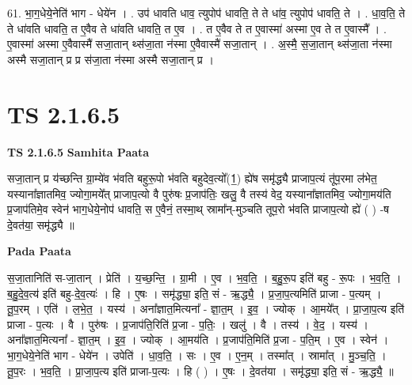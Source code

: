 \documentclass[17pt]{extarticle}
\begin{document}
61. भा॒ग॒धेये॒नेति॑ भाग - धेये॑न । . उप॑ धावति धाव॒ त्युपोप॑ धावति॒ ते ते धा॑व॒ त्युपोप॑ धावति॒ ते । . धा॒व॒ति॒ ते ते धा॑वति धावति॒ त ए॒वैव ते धा॑वति धावति॒ त ए॒व । . त ए॒वैव ते त ए॒वास्मा॑ अस्मा ए॒व ते त ए॒वास्मै᳚ । . ए॒वास्मा॑ अस्मा ए॒वैवास्मै॑ सजा॒तान् थ्स॑जा॒ता न॑स्मा ए॒वैवास्मै॑ सजा॒तान् । . अ॒स्मै॒ स॒जा॒तान् थ्स॑जा॒ता न॑स्मा अस्मै सजा॒तान् प्र प्र स॑जा॒ता न॑स्मा अस्मै सजा॒तान् प्र । \newline
\pagebreak
{}
\section*{ TS 2.1.6.5 }

\textbf{TS 2.1.6.5 } \newline
\textbf{Samhita Paata} \newline

सजा॒तान् प्र य॑च्छन्ति ग्रा॒म्ये॑व भ॑वति बहुरू॒पो भ॑वति बहुदेव॒त्यो᳚(1॒) ह्ये॑ष समृ॑द्ध्यै प्राजाप॒त्यं तू॑प॒रमा ल॑भेत॒ यस्याना᳚ज्ञातमिव॒ ज्योगा॒मये᳚त् प्राजाप॒त्यो वै पुरु॑षः प्र॒जाप॑तिः॒ खलु॒ वै तस्य॑ वेद॒ यस्याना᳚ज्ञातमिव॒ ज्योगा॒मय॑ति प्र॒जाप॑तिमे॒व स्वेन॑ भाग॒धेये॒नोप॑ धावति॒ स ए॒वैनं॒ तस्मा॒थ् स्रामा᳚न्-मुञ्चति तूप॒रो भ॑वति प्राजाप॒त्यो ह्ये॑ ( ) -ष दे॒वत॑या॒ समृ॑द्ध्यै ॥ \newline

\textbf{Pada Paata} \newline

स॒जा॒तानिति॑ स-जा॒तान् । प्रेति॑ । य॒च्छ॒न्ति॒ । ग्रा॒मी । ए॒व । भ॒व॒ति॒ । ब॒हु॒रू॒प इति॑ बहु - रू॒पः । भ॒व॒ति॒ । ब॒हु॒दे॒व॒त्य॑ इति॑ बहु-दे॒व॒त्यः॑ । हि । ए॒षः । समृ॑द्ध्या॒ इति॒ सं - ऋ॒द्ध्यै॒ । प्र॒जा॒प॒त्यमिति॑ प्राजा - प॒त्यम् । तू॒प॒रम् । एति॑ । ल॒भे॒त॒ । यस्य॑ । अना᳚ज्ञात॒मित्यना᳚ - ज्ञा॒त॒म् । इ॒व॒ । ज्योक् । आ॒मये᳚त् । प्रा॒जा॒प॒त्य इति॑ प्राजा - प॒त्यः । वै । पुरु॑षः । प्र॒जाप॑ति॒रिति॑ प्र॒जा - प॒तिः॒ । खलु॑ । वै । तस्य॑ । वे॒द॒ । यस्य॑ । अना᳚ज्ञात॒मित्यना᳚ - ज्ञा॒त॒म् । इ॒व॒ । ज्योक् । आ॒मय॑ति । प्र॒जाप॑ति॒मिति॑ प्र॒जा - प॒ति॒म् । ए॒व । स्वेन॑ । भा॒ग॒धेये॒नेति॑ भाग - धेये॑न । उपेति॑ । धा॒व॒ति॒ । सः । ए॒व । ए॒न॒म् । तस्मा᳚त् । स्रामा᳚त् । मु॒ञ्च॒ति॒ । तू॒प॒रः । भ॒व॒ति॒ । प्रा॒जा॒प॒त्य इति॑ प्राजा-प॒त्यः । हि ( ) । ए॒षः । दे॒वत॑या । समृ॑द्ध्या॒ इति॒ सं - ऋ॒द्ध्यै॒ ॥  \newline
\end{document}
